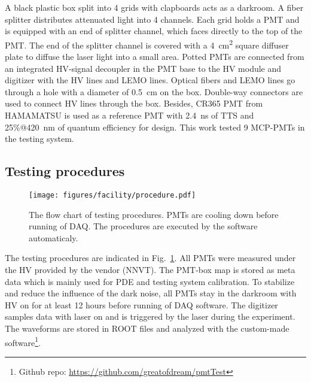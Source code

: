 A black plastic box split into 4 grids with clapboards acts as a darkroom. A fiber splitter %
distributes attenuated light into 4 channels. Each grid holds a PMT and is equipped with an end of splitter channel, which faces directly to the top of the PMT. The end of the splitter channel is covered with a \SI{4}{cm\tothe{2}} square diffuser plate to diffuse the laser light into a small area. Potted PMTs are connected from an integrated HV-signal decoupler in the PMT base to the HV module and digitizer with the HV lines and LEMO lines. Optical fibers and LEMO lines go through a hole with a diameter of \SI{0.5}{cm} on the box. Double-way connectors are used to connect HV lines through the box. Besides, CR365 PMT \cite{BJBS} from HAMAMATSU is used as a reference PMT with \SI{2.4}{ns} of TTS and 25\%@\SI{420}{nm} of quantum efficiency for design. %
This work tested 9 MCP-PMTs in the testing system.

\subsection{Testing procedures}
\begin{figure}
    \centering
    \texttt{[image: figures/facility/procedure.pdf]}
    \caption{The flow chart of testing procedures. PMTs are cooling down before running of DAQ. The procedures are executed by the software automaticaly.}
    \label{fig:testingprocedure}
\end{figure}

The testing procedures are indicated in Fig.~\ref{fig:testingprocedure}. All PMTs were measured under the HV provided by the vendor (NNVT). %
The PMT-box map is stored as meta data which is mainly used for PDE and testing system calibration. To stabilize and reduce the influence of the dark noise, all PMTs stay in the darkroom with HV on for at least 12 hours before running of DAQ software. %
The digitizer samples data with laser on and is triggered by the laser during the experiment. The waveforms are stored in ROOT files and analyzed with the custom-made software\footnote{Github repo: \url{https://github.com/greatofdream/pmtTest}}.
